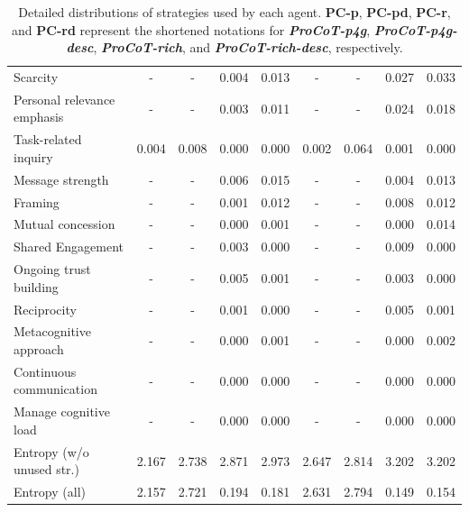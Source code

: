 \begin{table}[t]
\begin{tabular}{l|cccc|cccc}
        Scarcity & - & - & 0.004 & 0.013 & - & - & 0.027 & 0.033 \\ %
        Personal relevance emphasis & - & - & 0.003 & 0.011 & - & - & 0.024 & 0.018 \\ %
        Task-related inquiry & 0.004 & 0.008 & 0.000 & 0.000 & 0.002 & 0.064 & 0.001 & 0.000 \\ %
        Message strength & - & - & 0.006 & 0.015 & - & - & 0.004 & 0.013 \\ %
        Framing & - & - & 0.001 & 0.012 & - & - & 0.008 & 0.012 \\ %
        Mutual concession & - & - & 0.000 & 0.001 & - & - & 0.000 & 0.014 \\ %
        Shared Engagement & - & - & 0.003 & 0.000 & - & - & 0.009 & 0.000 \\ %
        Ongoing trust building & - & - & 0.005 & 0.001 & - & - & 0.003 & 0.000 \\ %
        Reciprocity & - & - & 0.001 & 0.000 & - & - & 0.005 & 0.001 \\ %
        Metacognitive approach & - & - & 0.000 & 0.001 & - & - & 0.000 & 0.002 \\ %
        Continuous communication & - & - & 0.000 & 0.000 & - & - & 0.000 & 0.000 \\ %
        Manage cognitive load & - & - & 0.000 & 0.000 & - & - & 0.000 & 0.000 \\ %
        \midrule
        Entropy (w/o unused str.) & 2.167 & 2.738 & 2.871 & 2.973 & 2.647 & 2.814 & 3.202 & 3.202 \\
        Entropy (all) & 2.157 & 2.721 & 0.194 & 0.181 & 2.631 & 2.794 & 0.149 & 0.154 \\
        \bottomrule
    \end{tabular}
    \caption{Detailed distributions of strategies used by each agent. \textbf{PC-p}, \textbf{PC-pd}, \textbf{PC-r}, and \textbf{PC-rd} represent the shortened notations for \textbf{\textit{ProCoT-p4g}}, \textbf{\textit{ProCoT-p4g-desc}}, \textbf{\textit{ProCoT-rich}}, and \textbf{\textit{ProCoT-rich-desc}}, respectively.}
    \label{tab:agent_strategy_analisis_both}
\end{table}